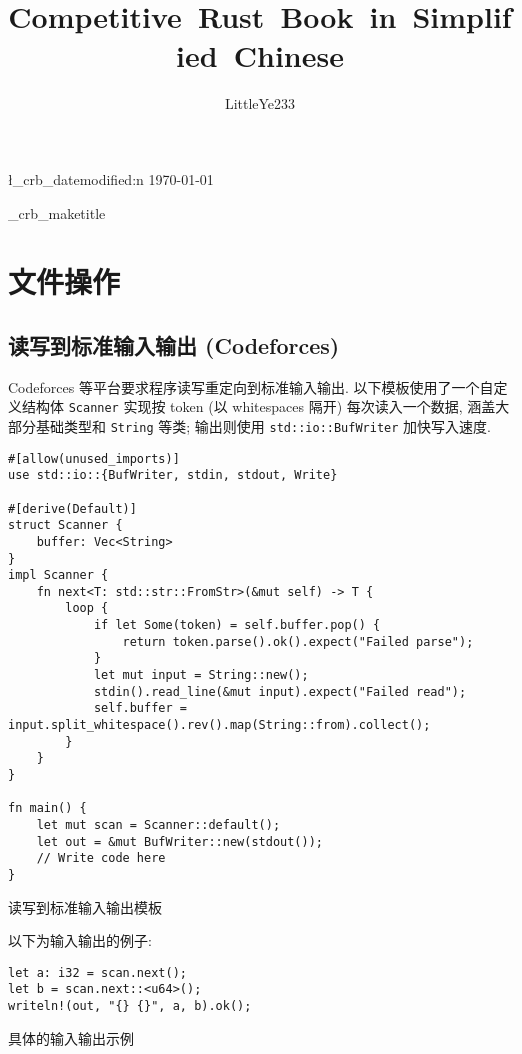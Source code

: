\documentclass{crbook}
\begin{document}
\ExplSyntaxOn

\title{Competitive\ Rust\ Book\ in\ Simplified\ Chinese}
\author{LittleYe233}
\l_crb_datemodified:n {\today}

\g_crb_maketitle

\newpage
\ExplSyntaxOff

\section{文件操作}
\subsection{读写到标准输入输出 (Codeforces)}

Codeforces 等平台要求程序读写重定向到标准输入输出. 以下模板使用了一个自定义结构体 \texttt{Scanner} 实现按 token (以 whitespaces 隔开) 每次读入一个数据, 涵盖大部分基础类型和 \texttt{String} 等类; 输出则使用 \texttt{std::io::BufWriter} 加快写入速度.

\begin{listing}
    \linespread{1}
    \begin{verbatim}
#[allow(unused_imports)]
use std::io::{BufWriter, stdin, stdout, Write}

#[derive(Default)]
struct Scanner {
    buffer: Vec<String>
}
impl Scanner {
    fn next<T: std::str::FromStr>(&mut self) -> T {
        loop {
            if let Some(token) = self.buffer.pop() {
                return token.parse().ok().expect("Failed parse");
            }
            let mut input = String::new();
            stdin().read_line(&mut input).expect("Failed read");
            self.buffer = input.split_whitespace().rev().map(String::from).collect();
        }
    }
}

fn main() {
    let mut scan = Scanner::default();
    let out = &mut BufWriter::new(stdout());
    // Write code here
}
    \end{verbatim}
    \caption{读写到标准输入输出模板}
\end{listing}

以下为输入输出的例子:

\begin{listing}
    \linespread{1}
    \begin{verbatim}
let a: i32 = scan.next();
let b = scan.next::<u64>();
writeln!(out, "{} {}", a, b).ok();
    \end{verbatim}
    \caption{具体的输入输出示例}
\end{listing}
\end{document}
